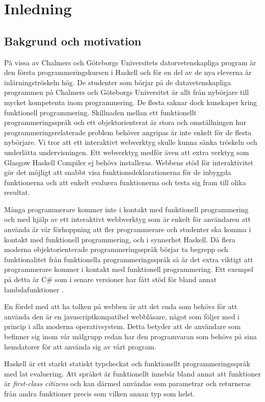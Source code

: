 ﻿\section{Inledning}
\subsection{Bakgrund och motivation}
På vissa av Chalmers och Göteborgs Universitets datorvetenskapliga program är den första programmeringskursen i Haskell \citep{haskell98} och för en del av de nya eleverna är inlärningströskeln hög. De studenter som börjar på de datavetenskapliga programmen på Chalmers och Göteborgs Universitet är allt från nybörjare till mycket kompetenta inom programmering. De flesta saknar dock kunskaper kring funktionell programmering. Skillnaden mellan ett funktionellt programmeringsspråk och ett objektorienterat är stora och omställningen hur programmeringsrelaterade problem behöver angripas  är inte enkelt för de flesta nybörjare. Vi tror att ett interaktivt webverktyg skulle kunna sänka tröskeln och underlätta undervisningen. Ett webverktyg medför även att extra verktyg som Glasgow Haskell Compiler \citep{ghc} ej behövs installeras. Webbens stöd för interaktivitet gör det möjligt att snabbt visa funktionsdeklarationerna för de inbyggda funktionerna och att enkelt evaluera funktionerna och testa sig fram till olika resultat.

Många programmerare kommer inte i kontakt med funktionell programmering  och med hjälp av ett interaktivt webbverktyg som är enkelt för användaren att använda är vår förhoppning att fler programmerare och studenter ska komma i kontakt med funktionell programmering, och i synnerhet Haskell. Då flera moderna objektorienterade programmeringsspråk börjar ta begrepp och funktionalitet från funktionella programmeringsspråk så är det extra viktigt att programmerare kommer i kontakt med funktionell programmering. Ett exempel på detta är C\# som i senare versioner har fått stöd för bland annat lambdafunktioner \citep{csharp}. 

En fördel med att ha tolken på webben är att det enda som behövs för att använda den är en javascriptkompatibel webbläsare, något som följer med i princip i alla moderna operativsystem. Detta betyder att de användare som befinner sig inom vår målgrupp redan har den programvaran som behövs på sina hemdatorer för att använda sig av vårt program.

Haskell är ett starkt statiskt typcheckat och funktionellt programmeringsspråk med lat evaluering. %
Att språket är funktionellt innebär bland annat att funktioner är \emph{first-class citizens} och kan därmed användas som parametrar och returneras från andra funktioner precis som vilken annan typ som helst.

